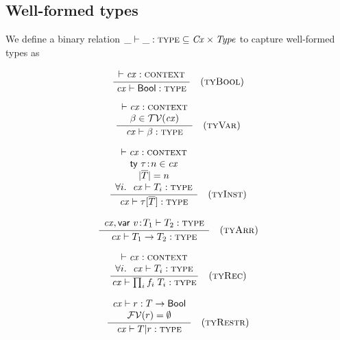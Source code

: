\subsection{Well-formed types}

We define a binary relation $\binrel{\istyY}{\Cx}{\Typ}$ to capture well-formed
types as

\[
\rruleI
 {\cxwfO}
 {\istyO{\bool}}
 {\Rtbool}
\]

\[
\rruleII
 {\cxwfO}
 {\tvar\in\cxtvarO}
 {\istyO{\tvar}}
 {\Rtvar}
\]

\[
\rruleIV
 {\cxwfO}
 {\tdecO\in\cx}
 {\seqlen{\typS}=n}
 {\FORALL{i}{\istyO{\typ_i}}}
 {\istyO{\tinstO}}
 {\Rtinst}
\]

\[
\rruleI
 {\isty{\snoc{\cx}{\vdec{\var}{\typ_1}}}{\typ_2}}
 {\istyO{\tarrO}}
 {\Rtarr}
\]

\[
\rruleII
 {\cxwfO}
 {\FORALL{i}{\istyO{\typ_i}}}
 {\istyO{\trecO}}
 {\Rtrec}
\]

\[
\rruleII
 {\hastyO{\tspred}{\tarr{\typ}{\bool}}}
 {\efvar{\tspred}=\emptyset}
 {\istyO{\tsubO}}
 {\Rtsub}
\]

